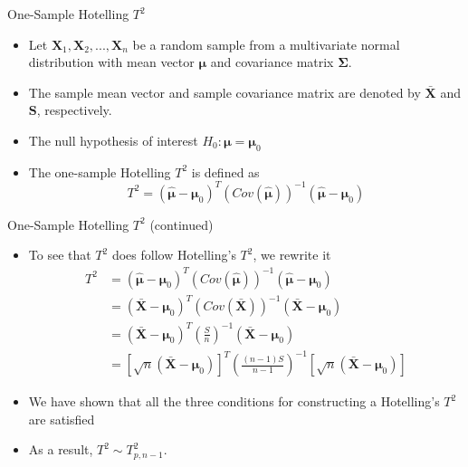 \documentclass[
  ignorenonframetext,
]{beamer}
\providecommand{\tightlist}{%
  \setlength{\itemsep}{0pt}\setlength{\parskip}{0pt}}
\begin{document}
\begin{frame}{One-Sample Hotelling \(T^2\)}
\protect\hypertarget{one-sample-hotelling-t2}{}
\begin{itemize}
\tightlist
\item
  Let \(\boldsymbol{X}_1, \boldsymbol{X}_2, ..., \boldsymbol{X}_n\) be a
  random sample from a multivariate normal distribution with mean vector
  \(\boldsymbol{\mu}\) and covariance matrix \(\boldsymbol{\Sigma}\).
\item
  The sample mean vector and sample covariance matrix are denoted by
  \(\bar{\mathbf X}\) and \(\mathbf S\), respectively.
\item
  The null hypothesis of interest
  \(H_0: \boldsymbol \mu = \boldsymbol \mu_0\)
\item
  The one-sample Hotelling \(T^2\) is defined as
  \[T^2=(\hat{\mathbf \mu} - \mathbf \mu_0)^T \left(Cov(\hat{\mathbf \mu})\right)^{-1}(\hat{\mathbf \mu} - \mathbf \mu_0)\]
\end{itemize}
\end{frame}

\begin{frame}{One-Sample Hotelling \(T^2\) (continued)}
\protect\hypertarget{one-sample-hotelling-t2-continued}{}
\begin{itemize}
\item
  To see that \(T^2\) does follow Hotelling's \(T^2\), we rewrite it \[
  \begin{aligned}
  T^2&=(\hat{\mathbf \mu} - \mathbf \mu_0)^T \left(Cov(\hat{\mathbf \mu})\right)^{-1}(\hat{\mathbf \mu} - \mathbf \mu_0)\\
  &= (\bar{\mathbf X} - \mathbf \mu_0)^T \left(Cov(\bar{\mathbf X})\right)^{-1}(\bar{\mathbf X} - \mathbf \mu_0)\\
  &= (\bar{\mathbf X} - \mathbf \mu_0)^T \left(\frac{S}{n}\right)^{-1}(\bar{\mathbf X} - \mathbf \mu_0)\\
  &= [\sqrt{n}(\bar{\mathbf X} - \mathbf \mu_0)]^T \left(\frac{(n-1)S}{n-1}\right)^{-1}[\sqrt{n}(\bar{\mathbf X} - \mathbf \mu_0)]
  \end{aligned}
  \]
\item
  We have shown that all the three conditions for constructing a
  Hotelling's \(T^2\) are satisfied
\item
  As a result, \(T^2\sim T_{p, n-1}^2\).
\end{itemize}
\end{frame}
\end{document}
